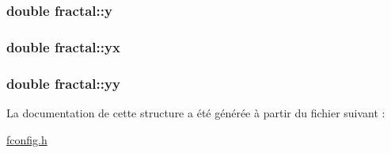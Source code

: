 \hypertarget{structfractal_a4bd6ee4742f683f13141f31c2d3799b7}{
\subsubsection[{y}]{\setlength{\rightskip}{0pt plus 5cm}double {\bf fractal\-::y}}}\label{structfractal_a4bd6ee4742f683f13141f31c2d3799b7}
\hypertarget{structfractal_aa52f4f35e4bd516179706f318397218a}{
\subsubsection[{yx}]{\setlength{\rightskip}{0pt plus 5cm}double {\bf fractal\-::yx}}}\label{structfractal_aa52f4f35e4bd516179706f318397218a}
\hypertarget{structfractal_abbf9466acf8986903f74754be308eb36}{
\subsubsection[{yy}]{\setlength{\rightskip}{0pt plus 5cm}double {\bf fractal\-::yy}}}\label{structfractal_abbf9466acf8986903f74754be308eb36}


\-La documentation de cette structure a été générée à partir du fichier suivant \-:\begin{DoxyCompactItemize}
\item 
\hyperlink{fconfig_8h}{fconfig.\-h}\end{DoxyCompactItemize}
